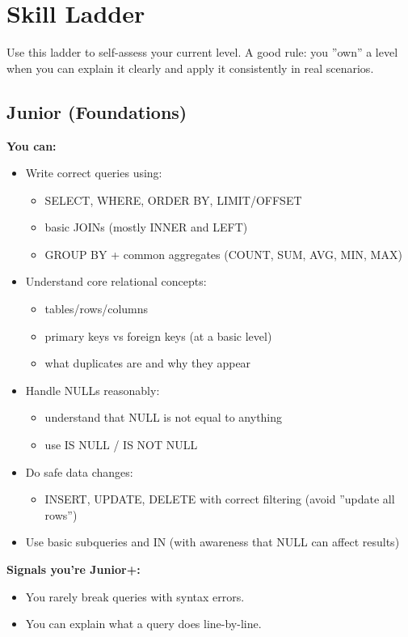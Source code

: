 \section{Skill Ladder}

Use this ladder to self-assess your current level. A good rule: you ''own'' a level when 
you can explain it clearly and apply it consistently in real scenarios.

\subsection{Junior (Foundations)}
\textbf{You can:}
\begin{itemize}
    \item Write correct queries using:
    \begin{itemize}
        \item SELECT, WHERE, ORDER BY, LIMIT/OFFSET
        \item basic JOINs (mostly INNER and LEFT)
        \item GROUP BY + common aggregates (COUNT, SUM, AVG, MIN, MAX)
    \end{itemize}
    \item Understand core relational concepts:
    \begin{itemize}
        \item tables/rows/columns
        \item primary keys vs foreign keys (at a basic level)
        \item what duplicates are and why they appear
    \end{itemize}
    \item Handle NULLs reasonably:
    \begin{itemize}
        \item understand that NULL is not equal to anything
        \item use IS NULL / IS NOT NULL
    \end{itemize}
    \item Do safe data changes:
    \begin{itemize}
        \item INSERT, UPDATE, DELETE with correct filtering (avoid ''update all rows'')
    \end{itemize}
    \item Use basic subqueries and IN (with awareness that NULL can affect results)
\end{itemize}

\textbf{Signals you're Junior+:}
\begin{itemize}
    \item You rarely break queries with syntax errors.
    \item You can explain what a query does line-by-line.
\end{itemize}


